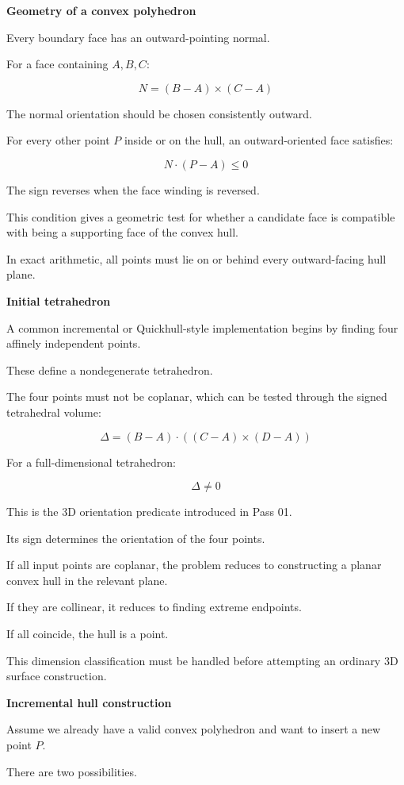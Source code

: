 \textbf{Geometry of a convex polyhedron}

Every boundary face has an outward-pointing normal.

For a face containing \(A,B,C\):

\[
N=(B-A)\times(C-A)
\]

The normal orientation should be chosen consistently outward.

For every other point \(P\) inside or on the hull, an outward-oriented face satisfies:

\[
\boxed{ N\cdot(P-A)\le0 }
\]

The sign reverses when the face winding is reversed.

This condition gives a geometric test for whether a candidate face is compatible with being a supporting face of the convex hull.

In exact arithmetic, all points must lie on or behind every outward-facing hull plane.

\textbf{Initial tetrahedron}

A common incremental or Quickhull-style implementation begins by finding four affinely independent points.

These define a nondegenerate tetrahedron.

The four points must not be coplanar, which can be tested through the signed tetrahedral volume:

\[
\boxed{ \Delta= (B-A)\cdot((C-A)\times(D-A)) }
\]

For a full-dimensional tetrahedron:

\[
\Delta\ne0
\]

This is the 3D orientation predicate introduced in Pass 01.

Its sign determines the orientation of the four points.

If all input points are coplanar, the problem reduces to constructing a planar convex hull in the relevant plane.

If they are collinear, it reduces to finding extreme endpoints.

If all coincide, the hull is a point.

This dimension classification must be handled before attempting an ordinary 3D surface construction.

\textbf{Incremental hull construction}

Assume we already have a valid convex polyhedron and want to insert a new point \(P\).

There are two possibilities.

